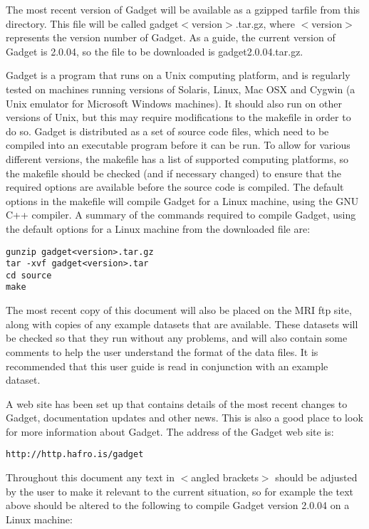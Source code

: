 \documentclass [a4paper, 10pt]{book}
\begin{document}
The most recent version of Gadget will be available as a gzipped tarfile from this directory.  This file will be called gadget$<$version$>$.tar.gz, where $<$version$>$ represents the version number of Gadget.  As a guide, the current version of Gadget is 2.0.04, so the file to be downloaded is gadget2.0.04.tar.gz.

\bigskip
Gadget is a program that runs on a Unix computing platform, and is regularly tested on machines running versions of Solaris, Linux, Mac OSX and Cygwin (a Unix emulator for Microsoft Windows machines).  It should also run on other versions of Unix, but this may require modifications to the makefile in order to do so.  Gadget is distributed as a set of source code files, which need to be compiled into an executable program before it can be run.  To allow for various different versions, the makefile has a list of supported computing platforms, so the makefile should be checked (and if necessary changed) to ensure that the required options are available before the source code is compiled.  The default options in the makefile will compile Gadget for a Linux machine, using the GNU C++ compiler.  A summary of the commands required to compile Gadget, using the default options for a Linux machine from the downloaded file are:

{\small\begin{verbatim}
gunzip gadget<version>.tar.gz
tar -xvf gadget<version>.tar
cd source
make
\end{verbatim}}

The most recent copy of this document will also be placed on the MRI ftp site, along with copies of any example datasets that are available.  These datasets will be checked so that they run without any problems, and will also contain some comments to help the user understand the format of the data files.  It is recommended that this user guide is read in conjunction with an example dataset.

\bigskip
A web site has been set up that contains details of the most recent changes to Gadget, documentation updates and other news.  This is also a good place to look for more information about Gadget.  The address of the Gadget web site is:

{\small\begin{verbatim}
http://http.hafro.is/gadget
\end{verbatim}}

Throughout this document any text in $<$angled brackets$>$ should be adjusted by the user to make it relevant to the current situation, so for example the text above should be altered to the following to compile Gadget version 2.0.04 on a Linux machine:
\end{document}
